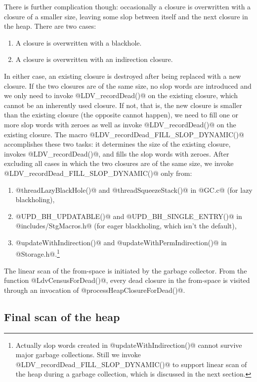 \documentclass{article}
\begin{document}
There is further complication though: occasionally a closure is
overwritten with a closure of a smaller size, leaving some slop
between itself and the next closure in the heap.  There are two cases:

\begin{enumerate}
\item A closure is overwritten with a blackhole. 
\item A closure is overwritten with an indirection closure.
\end{enumerate}

In either case, an existing closure is destroyed after being replaced
with a new closure.  If the two closures are of the same size, no slop
words are introduced and we only need to invoke @LDV_recordDead()@ on
the existing closure, which cannot be an inherently used closure.  If
not, that is, the new closure is smaller than the existing closure
(the opposite cannot happen), we need to fill one or more slop words
with zeroes as well as invoke @LDV_recordDead()@ on the existing
closure.  The macro @LDV_recordDead_FILL_SLOP_DYNAMIC()@ accomplishes
these two tasks: it determines the size of the existing closure,
invokes @LDV_recordDead()@, and fills the slop words with zeroes.
After excluding all cases in which the two closures are of the same
size, we invoke @LDV_recordDead_FILL_SLOP_DYNAMIC()@ only from:

\begin{enumerate}
\item @threadLazyBlackHole()@ and @threadSqueezeStack()@ in @GC.c@
(for lazy blackholing),
\item @UPD_BH_UPDATABLE()@ and @UPD_BH_SINGLE_ENTRY()@ in
@includes/StgMacros.h@ (for eager blackholing, which isn't the
default),
\item @updateWithIndirection()@ and @updateWithPermIndirection()@ 
in @Storage.h@.\footnote{Actually slop words created in 
@updateWithIndirection()@ cannot survive major garbage collections.
Still we invoke @LDV\_recordDead\_FILL\_SLOP\_DYNAMIC()@ to support linear
scan of the heap during a garbage collection, which is discussed in the next
section.}
\end{enumerate}

The linear scan of the from-space is initiated by the garbage
collector.  From the function @LdvCensusForDead()@, every dead closure
in the from-space is visited through an invocation of
@processHeapClosureForDead()@.

\subsection{Final scan of the heap}
\end{document}
